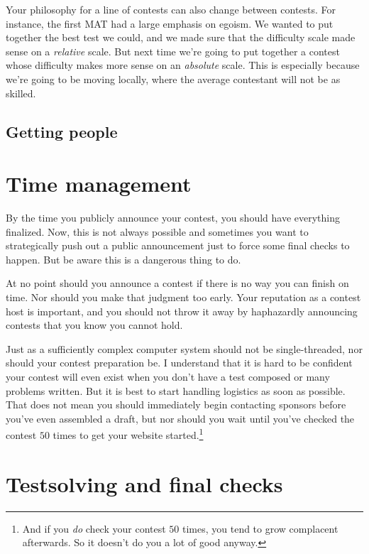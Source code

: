 \documentclass[points=false]{bounce}
\begin{document}
Your philosophy for a line of contests can also change between contests. For instance, the first MAT had a large emphasis on egoism. We wanted to put together the best test we could, and we made sure that the difficulty scale made sense on a \emph{relative} scale. But next time we're going to put together a contest whose difficulty makes more sense on an \emph{absolute} scale. This is especially because we're going to be moving locally, where the average contestant will not be as skilled.

\subsection{Getting people}

\section{Time management}

By the time you publicly announce your contest, you should have everything finalized. Now, this is not always possible and sometimes you want to strategically push out a public announcement just to force some final checks to happen. But be aware this is a dangerous thing to do.

At no point should you announce a contest if there is no way you can finish on time. Nor should you make that judgment too early. Your reputation as a contest host is important, and you should not throw it away by haphazardly announcing contests that you know you cannot hold.

Just as a sufficiently complex computer system should not be single-threaded, nor should your contest preparation be. I understand that it is hard to be confident your contest will even exist when you don't have a test composed or many problems written. But it is best to start handling logistics as soon as possible. That does not mean you should immediately begin contacting sponsors before you've even assembled a draft, but nor should you wait until you've checked the contest $50$ times to get your website started.\footnote{And if you \emph{do} check your contest $50$ times, you tend to grow complacent afterwards. So it doesn't do you a lot of good anyway.}

\section{Testsolving and final checks}
\end{document}
